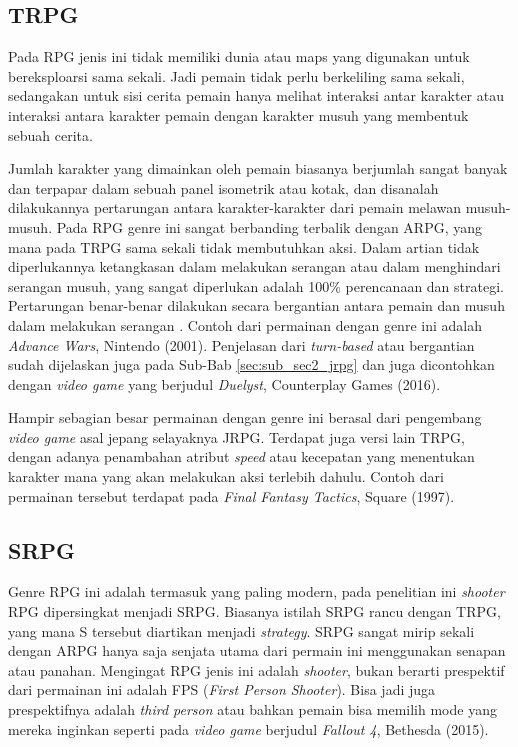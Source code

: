 \subsection{TRPG}
\label{sec:sub_sec2_trpg}

Pada RPG jenis ini tidak memiliki dunia atau maps yang digunakan untuk bereksploarsi sama sekali. Jadi pemain tidak perlu berkeliling sama sekali, sedangakan untuk sisi cerita pemain hanya melihat interaksi antar karakter atau interaksi antara karakter pemain dengan karakter musuh yang membentuk sebuah cerita.
\vspace{1ex}

Jumlah karakter yang dimainkan oleh pemain biasanya berjumlah sangat banyak dan terpapar dalam sebuah panel isometrik atau kotak, dan disanalah dilakukannya pertarungan antara karakter-karakter dari pemain melawan musuh-musuh. Pada RPG genre ini sangat berbanding terbalik dengan ARPG, yang mana pada TRPG sama sekali tidak membutuhkan aksi. Dalam artian tidak diperlukannya ketangkasan dalam melakukan serangan atau dalam menghindari serangan musuh, yang sangat diperlukan adalah 100\% perencanaan dan strategi. Pertarungan benar-benar dilakukan secara bergantian antara pemain dan musuh dalam melakukan serangan \citep{moore2016}. Contoh dari permainan dengan genre ini adalah \textit{Advance Wars}, Nintendo (2001). Penjelasan dari \textit{turn-based} atau bergantian sudah dijelaskan juga pada Sub-Bab \ref{sec:sub_sec2_jrpg} dan juga dicontohkan dengan \textit{video game} yang berjudul \textit{Duelyst}, Counterplay Games (2016).
\vspace{1ex}

Hampir sebagian besar permainan dengan genre ini berasal dari pengembang \textit{video game} asal jepang selayaknya JRPG. Terdapat juga versi lain TRPG, dengan adanya penambahan atribut \textit{speed} atau kecepatan yang menentukan karakter mana yang akan melakukan aksi terlebih dahulu. Contoh dari permainan tersebut terdapat pada \textit{Final Fantasy Tactics}, Square (1997).
\vspace{1ex}

\subsection{SRPG}
\label{sec:sub_sec2_srpg}

Genre RPG ini adalah termasuk yang paling modern, pada penelitian ini \textit{shooter} RPG dipersingkat menjadi SRPG. Biasanya istilah SRPG rancu dengan TRPG, yang mana S tersebut diartikan menjadi \textit{strategy}. SRPG sangat mirip sekali dengan ARPG hanya saja senjata utama dari permain ini menggunakan senapan atau panahan. Mengingat RPG jenis ini adalah \textit{shooter}, bukan berarti prespektif dari permainan ini adalah FPS (\textit{First Person Shooter}). Bisa jadi juga prespektifnya adalah \textit{third person} atau bahkan pemain bisa memilih mode yang mereka inginkan seperti pada \textit{video game} berjudul \textit{Fallout 4}, Bethesda (2015).
\vspace{1ex}

